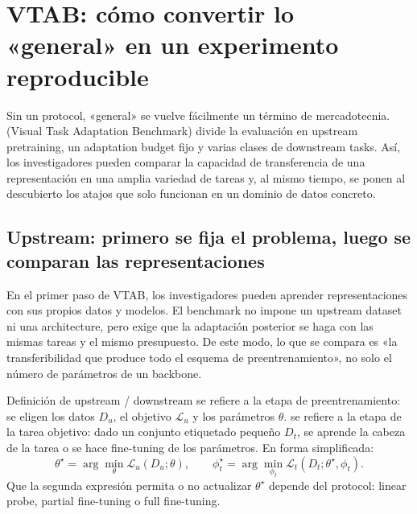\section{VTAB: cómo convertir lo «general» en un experimento reproducible}

Sin un protocol, «general» se vuelve fácilmente un término de mercadotecnia.  (Visual Task Adaptation Benchmark) divide la evaluación en upstream pretraining, un adaptation budget fijo y varias clases de downstream tasks. Así, los investigadores pueden comparar la capacidad de transferencia de una representación en una amplia variedad de tareas y, al mismo tiempo, se ponen al descubierto los atajos que solo funcionan en un dominio de datos concreto.

\subsection{Upstream: primero se fija el problema, luego se comparan las representaciones}

En el primer paso de VTAB, los investigadores pueden aprender representaciones con sus propios datos y modelos. El benchmark no impone un upstream dataset ni una architecture, pero exige que la adaptación posterior se haga con las mismas tareas y el mismo presupuesto. De este modo, lo que se compara es «la transferibilidad que produce todo el esquema de preentrenamiento», no solo el número de parámetros de un backbone.


\begin{importantbox}{Definición de upstream / downstream}
 se refiere a la etapa de preentrenamiento: se eligen los datos $D_u$, el objetivo $\mathcal{L}_u$ y los parámetros $\theta$.  se refiere a la etapa de la tarea objetivo: dado un conjunto etiquetado pequeño $D_t$, se aprende la cabeza de la tarea o se hace fine-tuning de los parámetros. En forma simplificada:
\[
\theta^{\star}=\arg\min_{\theta}\mathcal{L}_u(D_u;\theta),\qquad
\phi_t^{\star}=\arg\min_{\phi_t}\mathcal{L}_t(D_t;\theta^{\star},\phi_t).
\]
Que la segunda expresión permita o no actualizar $\theta^{\star}$ depende del protocol: linear probe, partial fine-tuning o full fine-tuning.
\end{importantbox}

